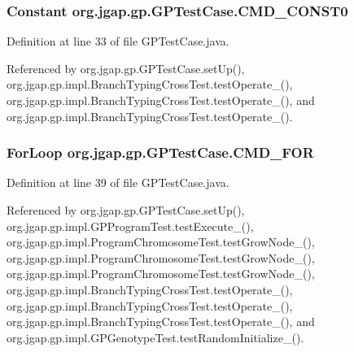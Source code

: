 \hypertarget{classorg_1_1jgap_1_1gp_1_1_g_p_test_case_ab33f5fe9e1dc9db8b7165d7429e27dbc}{
\subsubsection[{C\-M\-D\-\_\-\-C\-O\-N\-S\-T0}]{\setlength{\rightskip}{0pt plus 5cm}Constant org.\-jgap.\-gp.\-G\-P\-Test\-Case.\-C\-M\-D\-\_\-\-C\-O\-N\-S\-T0\hspace{0.3cm}{\ttfamily [protected]}}}\label{classorg_1_1jgap_1_1gp_1_1_g_p_test_case_ab33f5fe9e1dc9db8b7165d7429e27dbc}


Definition at line 33 of file G\-P\-Test\-Case.\-java.



Referenced by org.\-jgap.\-gp.\-G\-P\-Test\-Case.\-set\-Up(), org.\-jgap.\-gp.\-impl.\-Branch\-Typing\-Cross\-Test.\-test\-Operate\-\_(), org.\-jgap.\-gp.\-impl.\-Branch\-Typing\-Cross\-Test.\-test\-Operate\-\_(), and org.\-jgap.\-gp.\-impl.\-Branch\-Typing\-Cross\-Test.\-test\-Operate\-\_().

\hypertarget{classorg_1_1jgap_1_1gp_1_1_g_p_test_case_af0b86b0228a8380bfe8bbb749718256c}{
\subsubsection[{C\-M\-D\-\_\-\-F\-O\-R}]{\setlength{\rightskip}{0pt plus 5cm}For\-Loop org.\-jgap.\-gp.\-G\-P\-Test\-Case.\-C\-M\-D\-\_\-\-F\-O\-R\hspace{0.3cm}{\ttfamily [protected]}}}\label{classorg_1_1jgap_1_1gp_1_1_g_p_test_case_af0b86b0228a8380bfe8bbb749718256c}


Definition at line 39 of file G\-P\-Test\-Case.\-java.



Referenced by org.\-jgap.\-gp.\-G\-P\-Test\-Case.\-set\-Up(), org.\-jgap.\-gp.\-impl.\-G\-P\-Program\-Test.\-test\-Execute\-\_(), org.\-jgap.\-gp.\-impl.\-Program\-Chromosome\-Test.\-test\-Grow\-Node\-\_(), org.\-jgap.\-gp.\-impl.\-Program\-Chromosome\-Test.\-test\-Grow\-Node\-\_(), org.\-jgap.\-gp.\-impl.\-Program\-Chromosome\-Test.\-test\-Grow\-Node\-\_(), org.\-jgap.\-gp.\-impl.\-Branch\-Typing\-Cross\-Test.\-test\-Operate\-\_(), org.\-jgap.\-gp.\-impl.\-Branch\-Typing\-Cross\-Test.\-test\-Operate\-\_(), org.\-jgap.\-gp.\-impl.\-Branch\-Typing\-Cross\-Test.\-test\-Operate\-\_(), and org.\-jgap.\-gp.\-impl.\-G\-P\-Genotype\-Test.\-test\-Random\-Initialize\-\_().

